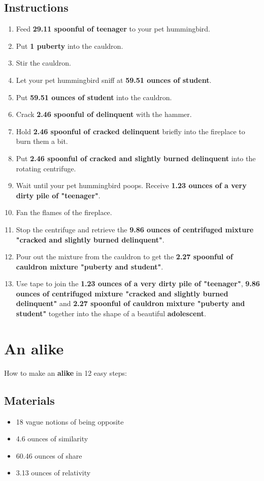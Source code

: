 \documentclass{article}
\begin{document}
\subsection{Instructions}\begin{enumerate}
\item 
Feed \textbf{29.11 spoonful of teenager} to your pet hummingbird.
\item 
Put \textbf{1 puberty} into the cauldron.
\item 
Stir the cauldron.
\item 
Let your pet hummingbird sniff at \textbf{59.51 ounces of student}.
\item 
Put \textbf{59.51 ounces of student} into the cauldron.
\item 
Crack \textbf{2.46 spoonful of delinquent} with the hammer.
\item 
Hold \textbf{2.46 spoonful of cracked delinquent} briefly into the fireplace to burn them a bit.
\item 
Put \textbf{2.46 spoonful of cracked and slightly burned delinquent} into the rotating centrifuge.
\item 
Wait until your pet hummingbird poops. Receive \textbf{1.23 ounces of a very dirty pile of "teenager"}.
\item 
Fan the flames of the fireplace.
\item 
Stop the centrifuge and retrieve the \textbf{9.86 ounces of centrifuged mixture "cracked and slightly burned delinquent"}.
\item 
Pour out the mixture from the cauldron to get the \textbf{2.27 spoonful of cauldron mixture "puberty and student"}.
\item 
Use tape to join the \textbf{1.23 ounces of a very dirty pile of "teenager"}, \textbf{9.86 ounces of centrifuged mixture "cracked and slightly burned delinquent"} and \textbf{2.27 spoonful of cauldron mixture "puberty and student"} together into the shape of a beautiful \textbf{adolescent}.
\end{enumerate}
\newpage
\section{An alike}How to make an \textbf{alike} in 12 easy steps:

\subsection{Materials}\begin{itemize}
\item 
18 vague notions of being opposite
\item 
4.6 ounces of similarity
\item 
60.46 ounces of share
\item 
3.13 ounces of relativity
\end{itemize}
\end{document}
